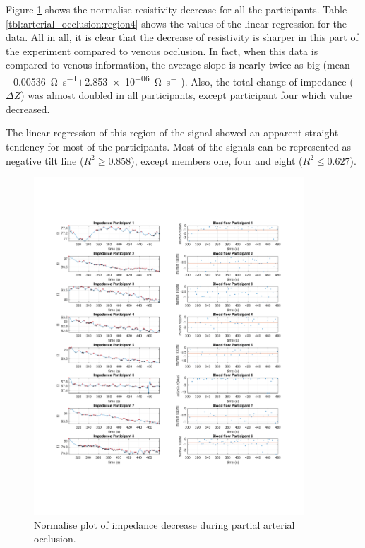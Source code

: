 Figure \ref{fig:normalise:arterial_occlusion} shows the normalise resistivity decrease for all the participants. Table \ref{tbl:arterial_occlusion:region4} shows the values of the linear regression for the data.   All in all, it is clear that the decrease of resistivity is sharper in this part of the experiment compared to venous occlusion.  In fact, when this data is compared to venous information, the average slope is nearly twice as big (mean \SI{-0.00536}{\ohm\per\second}$\pm$\SI{2.853e-06}{\ohm\per\second}). Also, the total change of impedance ($\Delta Z$) was almost doubled in all participants, except participant four which value decreased.  

The linear regression of this region of the signal showed an apparent straight tendency for most of the participants. Most of the signals can be represented as negative tilt line ($R^2 \geq 0.858 $), except members one, four and eight ($R^2 \leq 0.627 $).

\begin{figure}
	\centering
	\includegraphics[width=0.9\textwidth,height=0.9\textheight,keepaspectratio]{figure4}    
	\caption{Normalise plot of impedance decrease during partial arterial occlusion.}
	\label{fig:normalise:arterial_occlusion}
\end{figure}

